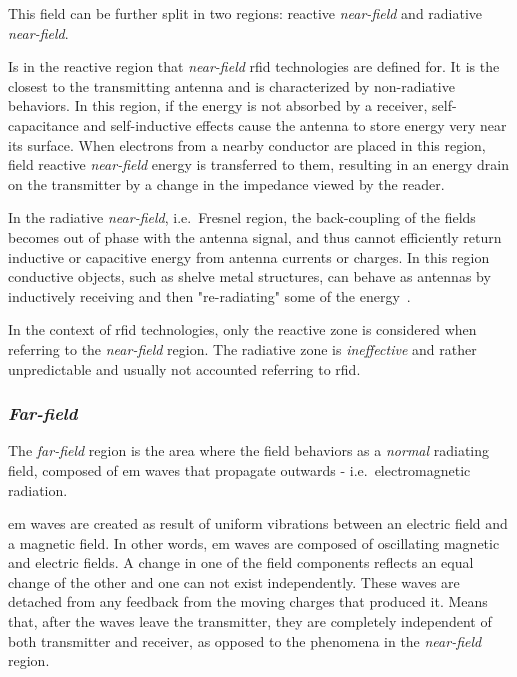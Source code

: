 This field can be further split in two regions: reactive \emph{near-field} and radiative \emph{near-field}.

Is in the reactive region that \emph{near-field} \ac{rfid} technologies are defined for. It is the closest to the transmitting antenna and is characterized by non-radiative behaviors. In this region, if the energy is not absorbed by a receiver, self-capacitance and self-inductive effects cause the antenna to store energy very near its surface. When electrons from a nearby conductor are placed in this region, field reactive \emph{near-field} energy is transferred to them, resulting in an energy drain on the transmitter by a change in the impedance viewed by the reader.

In the radiative \emph{near-field}, i.e.\ Fresnel region, the back-coupling of the fields becomes out of phase with the antenna signal, and thus cannot efficiently return inductive or capacitive energy from antenna currents or charges.
In this region conductive objects, such as shelve metal structures, can behave as antennas by inductively receiving and then "re-radiating" some of the energy~\cite{ElectromagneticRadiationField}.

In the context of \ac{rfid} technologies, only the reactive zone is considered when referring to the \emph{near-field} region. The radiative zone is \textit{ineffective} and rather unpredictable and usually not accounted referring to \ac{rfid}.

\subsubsection{\emph{Far-field}}

The \emph{far-field} region is the area where the field behaviors as a \textit{normal} radiating field, composed of \ac{em} waves that propagate outwards - i.e.\ electromagnetic radiation.

\ac{em} waves are created as result of uniform vibrations between an electric field and a magnetic field. In other words, \ac{em} waves are composed of oscillating magnetic and electric fields. A change in one of the field components reflects an equal change of the other and one can not exist independently.
These waves are detached from any feedback from the moving charges that produced it. Means that, after the waves leave the transmitter, they are completely independent of both transmitter and receiver, as opposed to the phenomena in the \emph{near-field} region.

